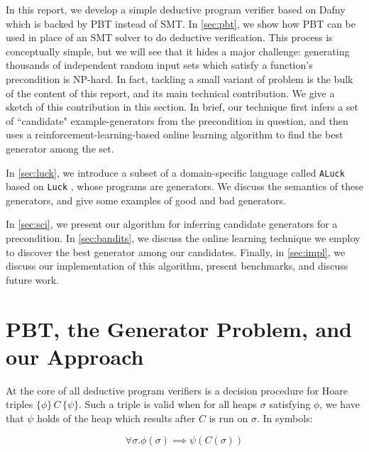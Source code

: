 \documentclass[10pt,a4paper]{article}
\begin{document}
In this report, we develop a simple deductive program verifier based on Dafny which is backed by PBT instead of SMT. In \autoref{sec:pbt}, we show how PBT can be used in place of an SMT solver to do deductive verification. This process is conceptually simple, but we will see that it hides a major challenge: generating thousands of independent random input sets which satisfy a function's precondition is NP-hard. In fact, tackling a small variant of problem is the bulk of the content of this report, and its main technical contribution. We give a sketch of this contribution in this section. In brief, our technique first infers a set of ``candidate" example-generators from the precondition in question, and then uses a reinforcement-learning-based online learning algorithm to find the best generator among the set.

In \autoref{sec:luck}, we introduce a subset of a domain-specific language called \texttt{ALuck} based on \texttt{Luck} \cite{luck}, whose programs are generators. We discuss the semantics of these generators, and give some examples of good and bad generators.

In \autoref{sec:sci}, we present our algorithm for inferring candidate generators for a precondition. In \autoref{sec:bandits}, we discuss the online learning technique we employ to discover the best generator among our candidates. Finally, in \autoref{sec:impl}, we discuss our implementation of this algorithm, present benchmarks, and discuss future work.



\section{PBT, the Generator Problem, and our Approach}
\label{sec:pbt}
At the core of all deductive program verifiers is a decision procedure for Hoare triples $\{\phi\}\, C \, \{\psi\}$. Such a triple is valid when for all heaps $\sigma$ satisfying $\phi$, we have that $\psi$ holds of the heap which results after $C$ is run on $\sigma$. In symbols:

\[
\forall \sigma. \phi(\sigma) \implies \psi(C(\sigma)) \tag{$\ast$}
\]
\end{document}
